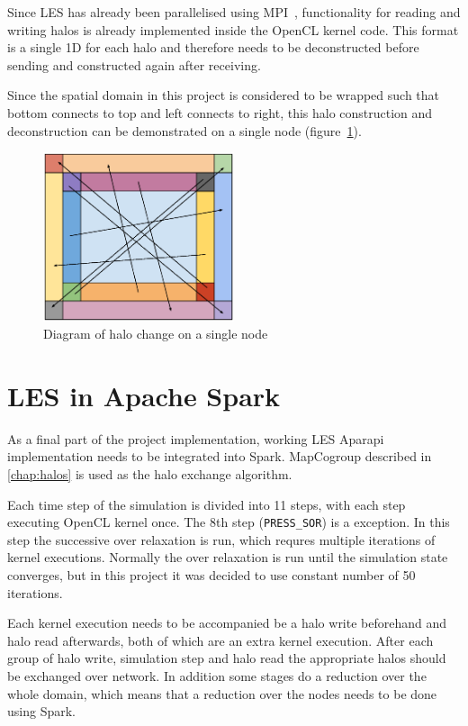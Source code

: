 \documentclass{l4proj}
\begin{document}
Since LES has already been parallelised using MPI~\cite{les_mpi}, functionality 
for reading and writing halos is already implemented inside the OpenCL kernel code.
This format is a single 1D for each halo and therefore needs to be deconstructed 
before sending and constructed again after receiving. 

Since the spatial domain in this project is considered to be wrapped such that
bottom connects to top and left connects to right, this halo construction and 
deconstruction can be demonstrated on a single node (figure~\ref{fig:halo_exchange}).

\begin{figure}
\centering
\includegraphics[width=0.5\textwidth]{images/Neighbour_exchange_2.eps}
\caption{Diagram of halo change on a single node}
\label{fig:halo_exchange}
\end{figure}

\section{LES in Apache Spark}

As a final part of the project implementation, working LES Aparapi implementation
needs to be integrated into Spark. MapCogroup described in \autoref{chap:halos}
is used as the halo exchange algorithm.

Each time step of the simulation is divided into 11 steps, with each step executing
OpenCL kernel once. The 8th step (\texttt{PRESS\_SOR}) is a exception. 
In this step the successive over relaxation is run, which requres multiple 
iterations of kernel executions. Normally the over relaxation is run until 
the simulation state converges, but in this project it was decided to use constant
number of 50 iterations.

Each kernel execution needs to be accompanied be a halo write beforehand 
and halo read afterwards, both of which are an extra kernel execution.
After each group of halo write, simulation step and halo read the appropriate halos
should be exchanged over network. In addition some stages do a reduction over 
the whole domain, which means that a reduction over the nodes needs to be done using Spark.
\end{document}
